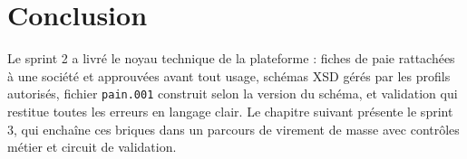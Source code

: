 \section{Conclusion}

Le sprint 2 a livré le noyau technique de la plateforme : fiches de paie rattachées à une société et approuvées avant tout usage, schémas XSD gérés par les profils autorisés, fichier \texttt{pain.001} construit selon la version du schéma, et validation qui restitue toutes les erreurs en langage clair. Le chapitre suivant présente le sprint 3, qui enchaîne ces briques dans un parcours de virement de masse avec contrôles métier et circuit de validation.

